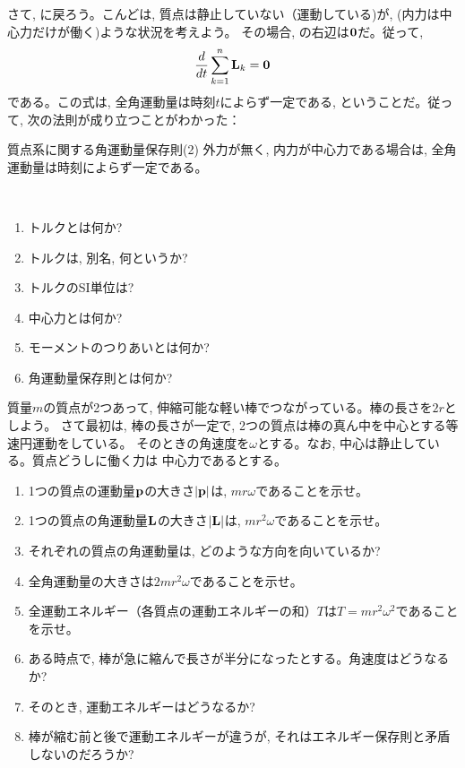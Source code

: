 さて, に戻ろう。こんどは, 質点は静止していない（運動している)が, 
(内力は中心力だけが働く)ような状況を考えよう。
その場合, の右辺は${\bf 0}$だ。従って, 
\begin{eqnarray} 
\frac{d}{dt}\sum_{k=1}^n {\bf L}_k={\bf 0}\label{eq:totangmomtorq3}
\end{eqnarray} 
である。この式は, 全角運動量は時刻$t$によらず一定である, ということだ。従って, 
次の法則が成り立つことがわかった：
\begin{itembox}{質点系に関する角運動量保存則(2)}
外力が無く, 内力が中心力である場合は, 全角運動量は時刻によらず一定である。
\end{itembox}


%
\begin{q}\label{q:torque}　
\begin{enumerate}
\item トルクとは何か? 
\item トルクは, 別名, 何というか? 
\item トルクのSI単位は? 
\item 中心力とは何か? 
\item モーメントのつりあいとは何か? 
\item 角運動量保存則とは何か? 
\end{enumerate}
\end{q}
\vspace{0.2cm}

%
\begin{q}\label{q:2points_rotation}
質量$m$の質点が2つあって, 伸縮可能な軽い棒でつながっている。棒の長さを$2r$としよう。
さて最初は, 棒の長さが一定で, 2つの質点は棒の真ん中を中心とする等速円運動をしている。
そのときの角速度を$\omega$とする。なお, 中心は静止している。質点どうしに働く力は
中心力であるとする。
\begin{enumerate}
\item 1つの質点の運動量${\bf p}$の大きさ$|{\bf p}|$は, $mr\omega$であることを示せ。
\item 1つの質点の角運動量${\bf L}$の大きさ$|{\bf L}|$は, $mr^2\omega$であることを示せ。
\item それぞれの質点の角運動量は, どのような方向を向いているか? 
\item 全角運動量の大きさは$2mr^2\omega$であることを示せ。
\item 全運動エネルギー（各質点の運動エネルギーの和）$T$は$T=mr^2\omega^2$であることを示せ。
\item ある時点で, 棒が急に縮んで長さが半分になったとする。角速度はどうなるか? 
\item そのとき, 運動エネルギーはどうなるか? 
\item 棒が縮む前と後で運動エネルギーが違うが, それはエネルギー保存則と矛盾しないのだろうか? 
\end{enumerate}
\end{q}
\hv


